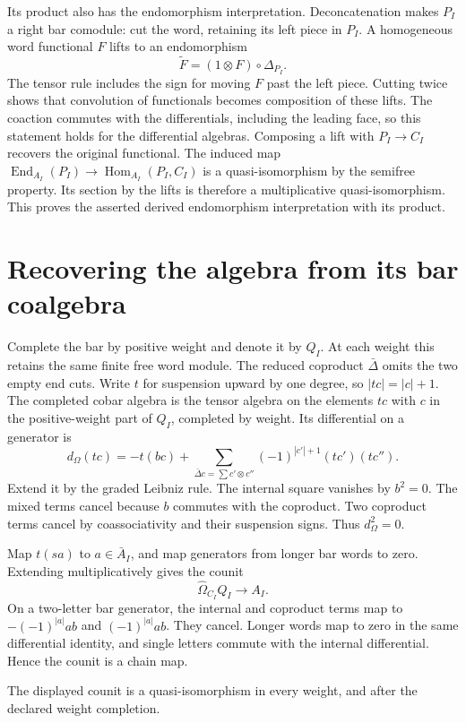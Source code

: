 Its product also has the endomorphism interpretation.
Deconcatenation makes $P_I$ a right bar comodule: cut the word,
retaining its left piece in $P_I$.
A homogeneous word functional $F$ lifts to an endomorphism
\[
 \widetilde F=(1\otimes F)\circ\Delta_{P_I}.
\]
The tensor rule includes the sign for moving $F$ past the left
piece. Cutting twice shows that convolution of functionals
becomes composition of these lifts.
The coaction commutes with the differentials, including the
leading face, so this statement holds for the differential algebras.
Composing a lift with $P_I\to C_I$ recovers the original functional.
The induced map
$\operatorname{End}_{A_I}(P_I)\to
\operatorname{Hom}_{A_I}(P_I,C_I)$
is a quasi-isomorphism by the semifree property.
Its section by the lifts is therefore a multiplicative
quasi-isomorphism. This proves the asserted derived endomorphism
interpretation with its product.

\section{Recovering the algebra from its bar coalgebra}

Complete the bar by positive weight and denote it by $Q_I$.
At each weight this retains the same finite free word module.
The reduced coproduct $\bar\Delta$ omits the two empty end cuts.
Write $t$ for suspension upward by one degree, so $|tc|=|c|+1$.
The completed cobar algebra is the tensor algebra on the elements
$tc$ with $c$ in the positive-weight part of $Q_I$, completed by
weight. Its differential on a generator is
\[
 d_\Omega(tc)=-t(bc)
 +\sum_{\bar\Delta c=\sum c'\otimes c''}
       (-1)^{|c'|+1}(tc')(tc'').
\]
Extend it by the graded Leibniz rule.
The internal square vanishes by $b^2=0$.
The mixed terms cancel because $b$ commutes with the coproduct.
Two coproduct terms cancel by coassociativity and their suspension
signs. Thus $d_\Omega^2=0$.

Map $t(sa)$ to $a\in\bar A_I$, and map generators from longer
bar words to zero. Extending multiplicatively gives the counit
\[
 \widehat\Omega_{C_I}Q_I\longrightarrow A_I.
\]
On a two-letter bar generator, the internal and coproduct terms
map to $-(-1)^{|a|}ab$ and $(-1)^{|a|}ab$.
They cancel. Longer words map to zero in the same differential
identity, and single letters commute with the internal
differential. Hence the counit is a chain map.

\begin{theorem}\label{thm:ocb-reconstruction}
The displayed counit is a quasi-isomorphism in every weight,
and after the declared weight completion.
\end{theorem}

